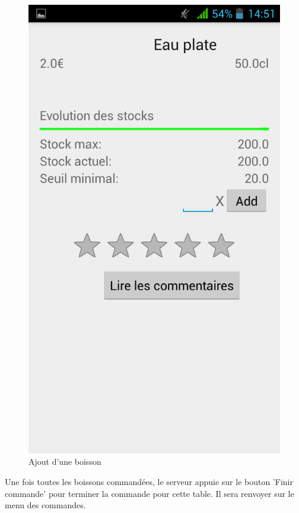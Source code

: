 \begin{figure}[H]
	\centering
	\includegraphics[scale=0.15]{img/add-drink.png}
	\caption{Ajout d'une boisson}
	\label{fig:add-drink}
\end{figure}

Une fois toutes les boissons commandées, le serveur appuie sur le bouton 'Finir commande' pour terminer la commande pour cette table. Il sera renvoyer sur le menu des commandes.

